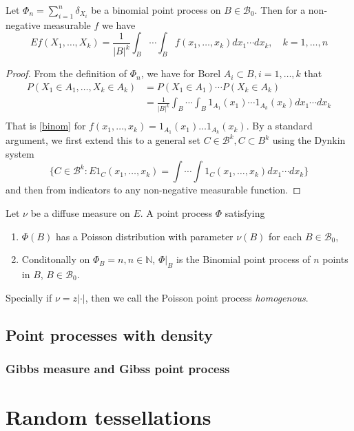 \begin{proposition}\label{bincalc}
Let $\Phi_n = \sum^{n}_{i=1}  \delta_{X_i}$ be a binomial point process on $B\in\mathcal B_0$. Then for a non-negative measurable $f$ we have
\begin{equation}\label{binom}
Ef(X_1,\dots, X_k) = \frac 1{|B|^k} \int_B \cdots \int_B f(x_1,\dots, x_k) dx_1 \cdots dx_k, \quad k = 1,\dots, n
\end{equation}
\end{proposition}
\begin{proof}
From the definition of $\Phi_n$, we have for Borel $A_i \subset B, i=1,\dots,k$ that
\begin{align*}
P(X_1 \in A_1, \dots, X_k \in A_k) &= P(X_1\in A_1)\cdots P(X_k\in A_k) \\ 
& = \frac 1{|B|^k} \int_B \cdots \int_B 1_{A_1}(x_1) \cdots 1_{A_k}(x_k) dx_1 \cdots dx_k \\
\end{align*}
That is \ref{binom} for $f(x_1,\dots,x_k)=1_{A_1}(x_1)\dots 1_{A_k}(x_k)$. By a standard argument, we first extend this to a general set $C \in \mathcal B^k, C\subset B^k$ using the Dynkin system 
$$\{C \in \mathcal B^k: E 1_C (x_1,\dots,x_k) = \int \cdots \int 1_C(x_1,\dots, x_k) dx_1 \cdots dx_k \}$$
 and then from indicators to any non-negative measurable function.
\end{proof}




\begin{definition} Let $\nu$ be a diffuse measure on $E$. A point process $\Phi$ satisfying
\begin{enumerate}
\item $\Phi(B)$ has a Poisson distribution with parameter $\nu(B)$ for each $B\in \mathcal B_0$,
\item Conditonally on $\Phi_B=n, n\in\mathbb N$,  $\Phi|_B$ is the Binomial point process of $n$ points in $B$, $B \in \mathcal B_0$.
\end{enumerate}
Specially if $\nu = z|\cdot |$, then we call the Poisson point process \textit{homogenous}.
\end{definition}







\subsection{Point processes with density}



\subsubsection{Gibbs measure and Gibss point process}

\section{Random tessellations}
